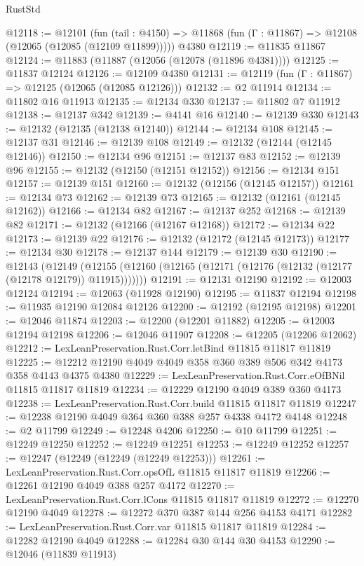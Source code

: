 \begin{lexlean}{RustStd}
\begin{coremodule}
{\begin{coremodule}
{{{{{{{{{{{{{{{{{{{{{{{{{{{{{{{{{{{{{{{{{{{{{{{{{{@12118 := @12101
    (fun (tail : @4150) => @11868 (fun (Γ : @11867) => @12108 (@12065 (@12085 (@12109 @11899)))))
    @4380
@12119 := @11835 @11867
@12124 := @11883 (@11887 (@12056 (@12078 (@11896 @4381))))
@12125 := @11837 @12124
@12126 := @12109 @4380
@12131 := @12119 (fun (Γ : @11867) => @12125 (@12065 (@12085 @12126)))
@12132 := @2 @11914
@12134 := @11802 @16 @11913
@12135 := @12134 @330
@12137 := @11802 @7 @11912
@12138 := @12137 @342
@12139 := @4141 @16
@12140 := @12139 @330
@12143 := @12132 (@12135 (@12138 @12140))
@12144 := @12134 @108
@12145 := @12137 @31
@12146 := @12139 @108
@12149 := @12132 (@12144 (@12145 @12146))
@12150 := @12134 @96
@12151 := @12137 @83
@12152 := @12139 @96
@12155 := @12132 (@12150 (@12151 @12152))
@12156 := @12134 @151
@12157 := @12139 @151
@12160 := @12132 (@12156 (@12145 @12157))
@12161 := @12134 @73
@12162 := @12139 @73
@12165 := @12132 (@12161 (@12145 @12162))
@12166 := @12134 @82
@12167 := @12137 @252
@12168 := @12139 @82
@12171 := @12132 (@12166 (@12167 @12168))
@12172 := @12134 @22
@12173 := @12139 @22
@12176 := @12132 (@12172 (@12145 @12173))
@12177 := @12134 @30
@12178 := @12137 @144
@12179 := @12139 @30
@12190 := @12143
    (@12149 (@12155 (@12160 (@12165 (@12171 (@12176 (@12132 (@12177 (@12178 @12179)) @11915)))))))
@12191 := @12131 @12190
@12192 := @12003 @12124
@12194 := @12063 (@11928 @12190)
@12195 := @11837 @12194
@12198 := @11935 @12190 @12084 @12126
@12200 := @12192 (@12195 @12198)
@12201 := @12046 @11874
@12203 := @12200 (@12201 @11882)
@12205 := @12003 @12194 @12198
@12206 := @12046 @11907
@12208 := @12205 (@12206 @12062)
@12212 := LexLeanPreservation.Rust.Corr.letBind @11815 @11817 @11819
@12225 := @12212 @12190 @4049 @4049 @358 @360 @389 @506 @342 @4173 @358 @4143 @4375 @4380
@12229 := LexLeanPreservation.Rust.Corr.eOfBNil @11815 @11817 @11819
@12234 := @12229 @12190 @4049 @389 @360 @4173
@12238 := LexLeanPreservation.Rust.Corr.build @11815 @11817 @11819
@12247 := @12238 @12190 @4049 @364 @360 @388 @257 @4338 @4172 @4148
@12248 := @2 @11799
@12249 := @12248 @4206
@12250 := @10 @11799
@12251 := @12249 @12250
@12252 := @12249 @12251
@12253 := @12249 @12252
@12257 := @12247 (@12249 (@12249 (@12249 @12253)))
@12261 := LexLeanPreservation.Rust.Corr.opsOfL @11815 @11817 @11819
@12266 := @12261 @12190 @4049 @388 @257 @4172
@12270 := LexLeanPreservation.Rust.Corr.lCons @11815 @11817 @11819
@12272 := @12270 @12190 @4049
@12278 := @12272 @370 @387 @144 @256 @4153 @4171
@12282 := LexLeanPreservation.Rust.Corr.var @11815 @11817 @11819
@12284 := @12282 @12190 @4049
@12288 := @12284 @30 @144 @30 @4153
@12290 := @12046 (@11839 @11913)
}}}}}}}}}}}}}}}}}}}}}}}}}}}}}}}}}}}}}}}}}}}}}}}}}}
\end{coremodule}}
\end{coremodule}
\end{lexlean}
